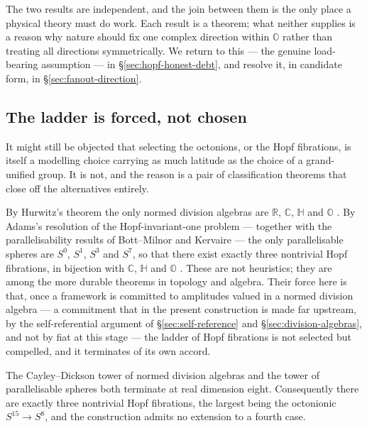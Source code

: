 The two results are independent, and the join between them is the only place a physical theory
must do work. Each result is a theorem; what neither supplies is a reason why nature should fix
one complex direction within $\mathbb{O}$ rather than treating all directions symmetrically. We
return to this --- the genuine load-bearing assumption --- in \S\ref{sec:hopf-honest-debt}, and
resolve it, in candidate form, in \S\ref{sec:fanout-direction}.

\subsection{The ladder is forced, not chosen}

It might still be objected that selecting the octonions, or the Hopf fibrations, is itself a
modelling choice carrying as much latitude as the choice of a grand-unified group. It is not,
and the reason is a pair of classification theorems that close off the alternatives entirely.

By Hurwitz's theorem the only normed division algebras are $\mathbb{R}$, $\mathbb{C}$,
$\mathbb{H}$ and $\mathbb{O}$ \autocite{hurwitz1898composition,baez2002octonions}. By Adams's
resolution of the Hopf-invariant-one problem --- together with the parallelisability results of
Bott--Milnor and Kervaire --- the only parallelisable spheres are $S^0$, $S^1$, $S^3$ and $S^7$,
so that there exist exactly three nontrivial Hopf fibrations, in bijection with $\mathbb{C}$,
$\mathbb{H}$ and $\mathbb{O}$
\autocite{adams1960hopf,bottmilnor1958parallelizability,kervaire1958nonparallelizability}. These
are not heuristics; they are among the more durable theorems in topology and algebra. Their
force here is that, once a framework is committed to amplitudes valued in a normed division
algebra --- a commitment that in the present construction is made far upstream, by the
self-referential argument of \S\ref{sec:self-reference} and \S\ref{sec:division-algebras}, and
not by fiat at this stage --- the ladder of Hopf fibrations is not selected but compelled, and
it terminates of its own accord.

\begin{proposition}[Termination]\label{prop:termination} The Cayley--Dickson tower of normed
division algebras and the tower of parallelisable spheres both terminate at real dimension
eight. Consequently there are exactly three nontrivial Hopf fibrations, the largest being the
octonionic $S^{15} \to S^8$, and the construction admits no extension to a fourth case.
\end{proposition}

